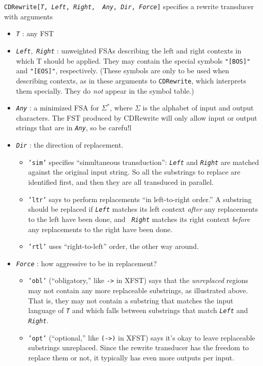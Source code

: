\documentclass[11pt]{article}
\newcommand{\Note}[1]{}
\newcommand{\NoteSigned}[3]{{\sethlcolor{#2}\Note{#1: #3}}}
\newcommand{\NoteJE}[1]{\NoteSigned{JE}{YellowGreen}{#1}}
\begin{document}
\begin{enumerate}[resume]
  \texttt{CDRewrite[{\em T}, {\em Left}, {\em Right}, {\em
      Any}, {\em Dir}, {\em Force}]} specifies a rewrite
  transducer with arguments

  \begin{itemize}
  \item \texttt{\em T} : any FST
  \item \texttt{\em Left},\ \texttt{\em Right} : unweighted FSAs
    describing the left and right contexts in which T should be
    applied.  They may contain the special symbols {\tt "[BOS]"} and
    {\tt "[EOS]"}, respectively.  (These symbols are only to be used
    when describing contexts, as in these arguments to
    \texttt{CDRewrite}, which interprets them specially.  They do {\em not} appear in the symbol
    table.)
  \item \texttt{\em Any} : a minimized FSA for $\Sigma^*$,
    where $\Sigma$ is the alphabet of input and output
    characters.\NoteJE{must \texttt{\em T} have identical input and
      output alphabets?}
    The FST produced by CDRewrite will only allow input or output
    strings that are in \texttt{\em Any}, so be carefu!l
  \item \texttt{\em Dir} : the direction of replacement.
    \begin{itemize}
    \item {\tt 'sim'} specifies ``simultaneous transduction'':
      \texttt{\em Left} and \texttt{\em Right} are matched
      against the original input string.  So all the substrings
      to replace are identified first, and then they are
      all transduced in parallel.
    \item {\tt 'ltr'} says to perform replacements ``in
      left-to-right order.''  A substring should be replaced if
      \texttt{\em Left} matches its left context {\em after} any
      replacements to the left have been done, and \texttt{\em
        Right} matches its right context {\em before} any
      replacements to the right have been done.
    \item {\tt 'rtl'} uses ``right-to-left'' order, the
      other way around.
    \end{itemize}
  \item \texttt{\em Force} : how aggressive to be in replacement?
    \begin{itemize}
    \item {\tt 'obl'} (``obligatory,'' like {\tt ->} in XFST) says that the {\em
        unreplaced} regions may not contain any more replaceable
      substrings, as illustrated above.  That is, they may not
      contain a substring that matches the input language of
      \texttt{\em T}
      and which falls between substrings that match
      \texttt{\em Left} and \texttt{\em Right}.
    \item \texttt{'opt'} (``optional,'' like {\tt (->)} in XFST)
      says it's okay to leave replaceable substrings
      unreplaced.  Since the rewrite transducer has the freedom to
      replace them or not, it typically has even more outputs per
      input.
    \end{itemize}
  \end{itemize}


\end{enumerate}
\end{document}
